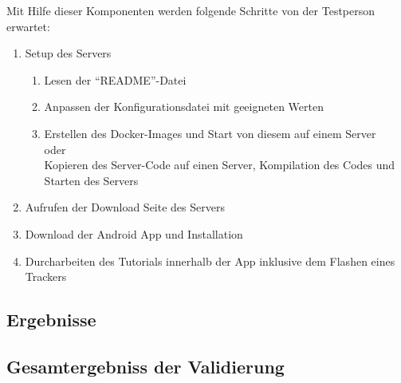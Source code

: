Mit Hilfe dieser Komponenten werden folgende Schritte von der Testperson erwartet:
\begin{enumerate}
	\item Setup des Servers
	\begin{enumerate}
		\item Lesen der \enquote{README}-Datei
		\item Anpassen der Konfigurationsdatei mit geeigneten Werten
		\item Erstellen des Docker-Images und Start von diesem auf einem Server \hfill \\
			\hspace*{20mm} oder \hfill \\
			Kopieren des Server-Code auf einen Server, Kompilation des Codes und Starten des Servers
	\end{enumerate}
	\item Aufrufen der Download Seite des Servers
	\item Download der Android App und Installation
	\item Durcharbeiten des Tutorials innerhalb der App inklusive dem Flashen eines Trackers
\end{enumerate}

\subsection{Ergebnisse}


\subsection{Gesamtergebniss der Validierung}